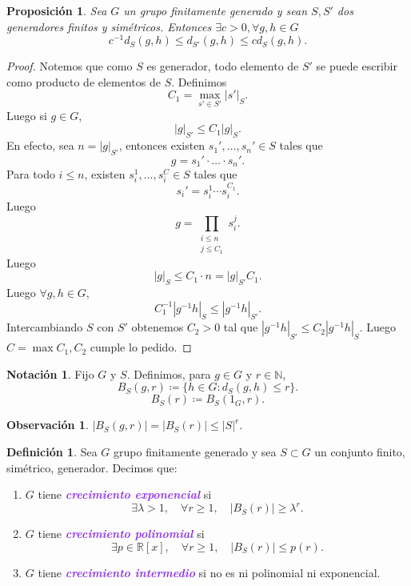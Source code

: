 \documentclass{article}
\newtheorem{proposition}[theorem]{Proposición}
\theoremstyle{definition}
\newtheorem{definition}[theorem]{Definición}
\newtheorem*{notation}{Notación}
\newtheorem*{obs}{Observación}
\theoremstyle{remark}
\numberwithin{equation}{section}
\newcommand{\N}{\mathbb{N}}
\newcommand{\R}{\mathbb{R}}
\newcommand{\lam}{\lambda}
\renewcommand{\c}{\cdot}
\newcommand{\abs}[1]{\left| #1 \right|}
\newcommand{\wea}[1]{\textcolor{BlueViolet}{\textbf{\emph{#1}}}}
\begin{document}
\begin{proposition}
  Sea $G$ un grupo finitamente generado y sean $S,S'$ dos generadores finitos y simétricos. Entonces $\exists c>0, \forall g,h \in G$
  \[c^{-1} d_S(g,h) \leq d_{S'}(g,h) \leq c d_S(g,h).\]
\end{proposition}
\begin{proof}
  Notemos que como $S$ es generador, todo elemento de $S'$ se puede escribir como producto de elementos de $S$. Definimos
  \[C_1 = \max_{s' \in S'} \abs{s'}_S.\]
  Luego si $g \in G$,
  \[\abs{g}_{S'} \leq C_1 \abs{g}_S.\]
  En efecto, sea $n = \abs{g}_{S'}$, entonces existen $s_1',\dots,s_n' \in S$ tales que
  \[g = s_1' \c \dots \c s_n'.\]
  Para todo $i \leq n$, existen $s_i^1, \dots, s_i^C \in S$ tales que
  \[s_i' = s_i^1 \cdots s_i^{C_1}.\]
  Luego
  \[g = \prod_{\substack{i \leq n \\ j \leq C_1}} s_i^j.\]
  Luego
  \[\abs{g}_S \leq C_1 \cdot n = \abs{g}_{S'} C_1.\]
  Luego $\forall g,h \in G$,
  \[C_1^{-1} \abs{g^{-1} h}_S \leq \abs{g^{-1} h}_{S'}.\]
  Intercambiando $S$ con $S'$ obtenemos $C_2 > 0$ tal que $\abs{g^{-1}h}_{S'} \leq C_2 \abs{g^{-1} h}_S.$
  Luego $C = \max{C_1,C_2}$ cumple lo pedido.
\end{proof}

\begin{notation}
  Fijo $G$ y $S$. Definimos, para $g \in G$ y $r \in \N$,
  \[B_S(g,r) \coloneqq \{h \in G \colon d_S(g,h) \leq r\}.\]
  \[B_S(r) \coloneqq B_S(1_G,r).\]
\end{notation}

\begin{obs}
  $\abs{B_S(g,r)} = \abs{B_S(r)} \leq \abs{S}^r$.
\end{obs}

\begin{definition}
  Sea $G$ grupo finitamente generado y sea $S \subset G$ un conjunto finito, simétrico, generador. Decimos que:
  \begin{enumerate}[(1)]
    \item $G$ tiene \wea{crecimiento exponencial} si $$\exists \lam>1, \quad \forall r \geq 1, \quad \abs{B_S(r)} \geq \lam^r.$$
    \item $G$ tiene \wea{crecimiento polinomial} si $$\exists p \in \R[x], \quad \forall r \geq 1, \quad \abs{B_S(r)} \leq p(r).$$
    \item $G$ tiene \wea{crecimiento intermedio} si no es ni polinomial ni exponencial.
  \end{enumerate}
\end{definition}
\end{document}
